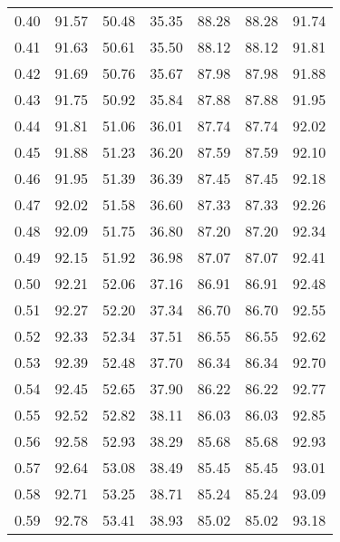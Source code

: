 \begin{tabular}{|c|c|c|c|c|c|c|}
      0.40 &     91.57 &     50.48 &      35.35 &   88.28 &      88.28 &         91.74 \\
      0.41 &     91.63 &     50.61 &      35.50 &   88.12 &      88.12 &         91.81 \\
      0.42 &     91.69 &     50.76 &      35.67 &   87.98 &      87.98 &         91.88 \\
      0.43 &     91.75 &     50.92 &      35.84 &   87.88 &      87.88 &         91.95 \\
      0.44 &     91.81 &     51.06 &      36.01 &   87.74 &      87.74 &         92.02 \\
      0.45 &     91.88 &     51.23 &      36.20 &   87.59 &      87.59 &         92.10 \\
      0.46 &     91.95 &     51.39 &      36.39 &   87.45 &      87.45 &         92.18 \\
      0.47 &     92.02 &     51.58 &      36.60 &   87.33 &      87.33 &         92.26 \\
      0.48 &     92.09 &     51.75 &      36.80 &   87.20 &      87.20 &         92.34 \\
      0.49 &     92.15 &     51.92 &      36.98 &   87.07 &      87.07 &         92.41 \\
      0.50 &     92.21 &     52.06 &      37.16 &   86.91 &      86.91 &         92.48 \\
      0.51 &     92.27 &     52.20 &      37.34 &   86.70 &      86.70 &         92.55 \\
      0.52 &     92.33 &     52.34 &      37.51 &   86.55 &      86.55 &         92.62 \\
      0.53 &     92.39 &     52.48 &      37.70 &   86.34 &      86.34 &         92.70 \\
      0.54 &     92.45 &     52.65 &      37.90 &   86.22 &      86.22 &         92.77 \\
      0.55 &     92.52 &     52.82 &      38.11 &   86.03 &      86.03 &         92.85 \\
      0.56 &     92.58 &     52.93 &      38.29 &   85.68 &      85.68 &         92.93 \\
      0.57 &     92.64 &     53.08 &      38.49 &   85.45 &      85.45 &         93.01 \\
      0.58 &     92.71 &     53.25 &      38.71 &   85.24 &      85.24 &         93.09 \\
      0.59 &     92.78 &     53.41 &      38.93 &   85.02 &      85.02 &         93.18 \\

\end{tabular}
